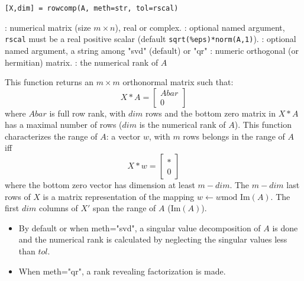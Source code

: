 
\begin{mandesc}
\end{mandesc}

\begin{calling_sequence}
\begin{verbatim}
[X,dim] = rowcomp(A, meth=str, tol=rscal) 
\end{verbatim}
\end{calling_sequence}
\begin{parameters}
  \begin{varlist}
    :  numerical matrix (size $m \times n$), real or complex.
    : optional named argument, \verb+rscal+ must be  a real positive scalar (default \verb+sqrt(%eps)*norm(A,1)+).
    : optional named argument, a string among "svd" (default) or "qr"
    : numeric orthogonal (or hermitian) matrix.
    : the numerical rank of $A$
  \end{varlist}
\end{parameters}

\begin{mandescription}
This function returns an $m \times m$ orthonormal matrix such that:
$$
  X*A  = \left[ \begin{array}{c} Abar \\ 0 \end{array} \right] 
$$
where $Abar$ is full row rank, with $dim$ rows and the bottom zero matrix
in $X*A$ has a maximal number of rows ($dim$ is the numerical rank of $A$).
This function characterizes the range of $A$: a vector $w$, with $m$ rows
belongs in the range of $A$ iff 
$$
X*w  = \left[ \begin{array}{c} \ast \\ 0 \end{array} \right]
$$
where the bottom zero vector has dimension at least $m-dim$.
The $m-dim$ last rows of $X$ is a matrix representation of the mapping
$w \leftarrow w \text{mod Im} (A)$. 
The first $dim$ columns of $X'$ span the range of $A$ ($\text{Im}(A)$).
\begin{itemize}
\item By default or when  meth="svd", a singular value decomposition 
of $A$ is done and the numerical rank is calculated by 
neglecting the singular values less than $tol$.
\item When  meth="qr", a rank revealing factorization is made.
\end{itemize}
\end{mandescription}

